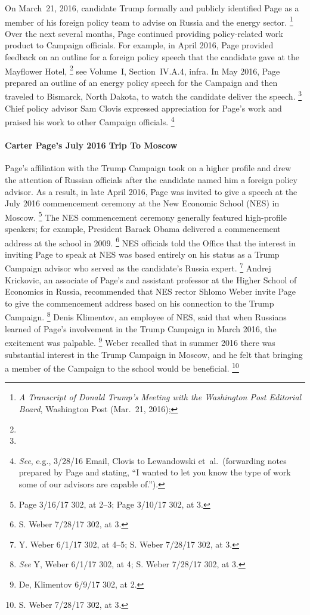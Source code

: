 On March~21, 2016, candidate Trump formally and publicly identified Page as a member of his foreign policy team to advise on Russia and the energy sector.%
\footnote{\textit{A Transcript of Donald Trump's Meeting with the Washington Post Editorial Board}, Washington Post (Mar.~21, 2016); }
Over the next several months, Page continued providing policy-related work product to Campaign officials.
For example, in April 2016, Page provided feedback on an outline for a foreign policy speech that the candidate gave at the Mayflower Hotel,%
\footnote{}
see Volume~I, Section~IV.A.4, infra.
In May 2016, Page prepared an outline of an energy policy speech for the Campaign and then traveled to Bismarck, North Dakota, to watch the candidate deliver the speech.%
\footnote{}
Chief policy advisor Sam Clovis expressed appreciation for Page's work and praised his work to other Campaign officials.%
\footnote{\textit{See}, e.g., 3/28/16 Email, Clovis to Lewandowski et~al.\
(forwarding notes prepared by Page and stating, “I wanted to let you know the type of work some of our advisors are capable of.”).}

\paragraph{Carter Page's July 2016 Trip To Moscow}

Page's affiliation with the Trump Campaign took on a higher profile and drew the attention of Russian officials after the candidate named him a foreign policy advisor.
As a result, in late April 2016, Page was invited to give a speech at the July 2016 commencement ceremony at the New Economic School (NES) in Moscow.%
\footnote{Page 3/16/17 302, at 2--3; Page 3/10/17 302, at 3.}
The NES commencement ceremony generally featured high-profile speakers; for example, President Barack Obama delivered a commencement address at the school in 2009.%
\footnote{S. Weber 7/28/17 302, at 3.}
NES officials told the Office that the interest in inviting Page to speak at NES was based entirely on his status as a Trump Campaign advisor who served as the candidate's Russia expert.%
\footnote{Y. Weber 6/1/17 302, at 4--5;
S. Weber 7/28/17 302, at 3.}
Andrej Krickovic, an associate of Page's and assistant professor at the Higher School of Economics in Russia, recommended that NES rector Shlomo Weber invite Page to give the commencement address based on his connection to the Trump Campaign.%
\footnote{\textit{See} Y, Weber 6/1/17 302, at 4;
S. Weber 7/28/17 302, at 3.}
Denis Klimentov, an employee of NES, said that when Russians learned of Page's involvement in the Trump Campaign in March 2016, the excitement was palpable.%
\footnote{De, Klimentov 6/9/17 302, at 2.}
Weber recalled that in summer 2016 there was substantial interest in the Trump Campaign in Moscow, and he felt that bringing a member of the Campaign to the school would be beneficial.%
\footnote{S. Weber 7/28/17 302, at 3.}

